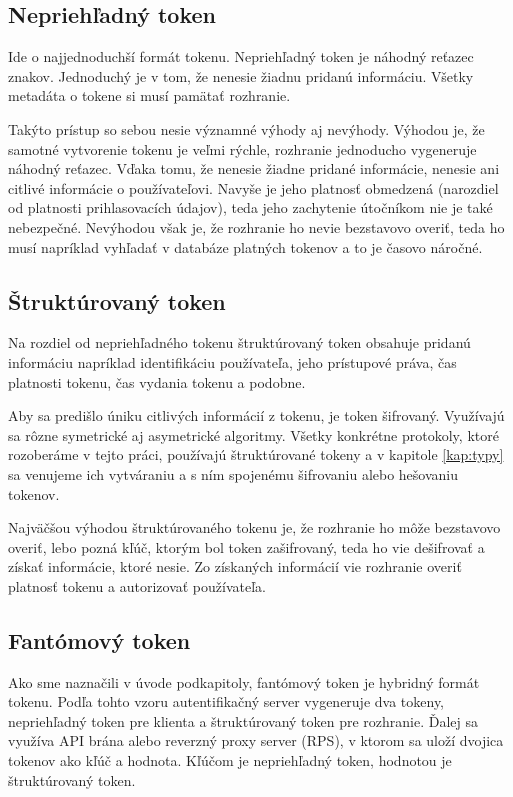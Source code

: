 \subsection{Nepriehľadný token}
\label{sec:opaque}

Ide o najjednoduchší formát tokenu. Nepriehľadný token je náhodný reťazec znakov. Jednoduchý je v tom, že nenesie žiadnu pridanú informáciu. Všetky metadáta o tokene si musí pamätať rozhranie.

Takýto prístup so sebou nesie významné výhody aj nevýhody. Výhodou je, že samotné vytvorenie tokenu je veľmi rýchle, rozhranie jednoducho vygeneruje náhodný reťazec. Vďaka tomu, že nenesie žiadne pridané informácie, nenesie ani citlivé informácie o používateľovi. Navyše je jeho platnosť obmedzená (narozdiel od platnosti prihlasovacích údajov), teda jeho zachytenie útočníkom nie je také nebezpečné. Nevýhodou však je, že rozhranie ho nevie bezstavovo overiť, teda ho musí napríklad vyhľadať v databáze platných tokenov a to je časovo náročné.


\subsection{Štruktúrovaný token}


Na rozdiel od nepriehľadného tokenu štruktúrovaný token obsahuje pridanú informáciu napríklad identifikáciu používateľa, jeho prístupové práva, čas platnosti tokenu, čas vydania tokenu a podobne.

Aby sa predišlo úniku citlivých informácií z tokenu, je token šifrovaný. Využívajú sa rôzne symetrické aj asymetrické algoritmy. Všetky konkrétne protokoly, ktoré rozoberáme v tejto práci, používajú štruktúrované tokeny a v kapitole \ref{kap:typy} sa venujeme ich vytváraniu a s ním spojenému šifrovaniu alebo hešovaniu tokenov.

Najväčšou výhodou štruktúrovaného tokenu je, že rozhranie ho môže bezstavovo overiť, lebo pozná kľúč, ktorým bol token zašifrovaný, teda ho vie dešifrovať a získať informácie, ktoré nesie. Zo získaných informácií vie rozhranie overiť platnosť tokenu a autorizovať používateľa.


\subsection{Fantómový token}

Ako sme naznačili v úvode podkapitoly, fantómový token \cite{phantom_token} je hybridný formát tokenu. Podľa tohto vzoru autentifikačný server vygeneruje dva tokeny, nepriehľadný token pre klienta a štruktúrovaný token pre rozhranie. Ďalej sa využíva API brána alebo reverzný proxy server (RPS), v ktorom sa uloží dvojica tokenov ako kľúč a hodnota. Kľúčom je nepriehľadný token, hodnotou je štruktúrovaný token.


